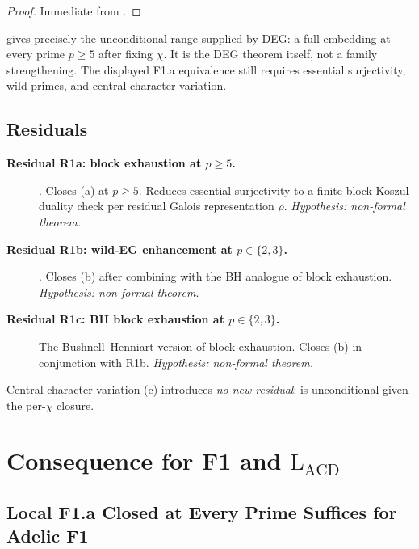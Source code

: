 \begin{proof}
Immediate from .
\end{proof}

\begin{remark}
\label{v4-arith:deg-f1a:rem:strongest-uncond}
 gives precisely the
unconditional range supplied by DEG: a full embedding at every prime
\(p\geq 5\) after fixing \(\chi\). It is the DEG theorem itself, not a
family strengthening. The displayed F1.a equivalence still requires
essential surjectivity, wild primes, and central-character variation.
\end{remark}

\subsection{Residuals}

\begin{description}
\item[\textbf{Residual R1a: block exhaustion at \(p\geq 5\).}]
. Closes (a) at
\(p\geq 5\). Reduces essential surjectivity to a finite-block
Koszul-duality check per residual Galois representation \(\rho\).
\emph{Hypothesis: non-formal theorem.}
\item[\textbf{Residual R1b: wild-EG enhancement at \(p\in\{2,3\}\).}]
. Closes (b) after
combining with the BH analogue of block exhaustion.
\emph{Hypothesis: non-formal theorem.}
\item[\textbf{Residual R1c: BH block exhaustion at \(p\in\{2,3\}\).}]
The Bushnell--Henniart version of block exhaustion. Closes (b) in
conjunction with R1b.
\emph{Hypothesis: non-formal theorem.}
\end{description}

Central-character variation (c) introduces \emph{no new residual}:
 is
unconditional given the per-\(\chi\) closure.

\section{Consequence for F1 and \(\mathrm{L}_{\mathrm{ACD}}\)}
\label{v4-arith:deg-f1a:global-check}

\subsection{Local F1.a Closed at Every Prime Suffices for Adelic F1}


